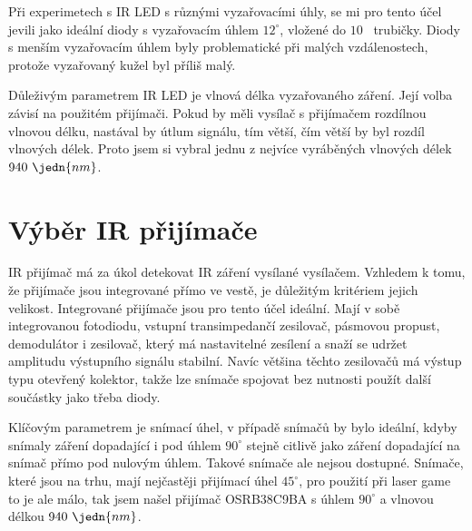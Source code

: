 Při experimetech s IR LED s různými vyzařovacími úhly, se mi pro tento účel jevili jako ideální diody s vyzařovacím úhlem $12^\circ$, vložené do $10$~ trubičky. Diody s menším vyzařovacím úhlem byly problematické při malých vzdálenostech, protože vyzařovaný kužel byl příliš malý.

Důleživým parametrem IR LED je vlnová délka vyzařovaného záření. Její volba závisí na použitém přijímači. Pokud by měli vysílač s přijímačem rozdílnou vlnovou délku, nastával by útlum signálu, tím větší, čím větší by byl rozdíl vlnových délek. Proto jsem si vybral jednu z nejvíce vyráběných vlnových délek $940~\jedn{nm}$.

\section{Výběr IR přijímače}
IR přijímač má za úkol detekovat IR záření vysílané vysílačem. Vzhledem k tomu, že přijímače jsou integrované přímo ve vestě, je důležitým kritériem jejich velikost. Integrované přijímače jsou pro tento účel ideální. Mají v sobě integrovanou fotodiodu, vstupní transimpedančí zesilovač, pásmovou propust, demodulátor i zesilovač, který má nastavitelné zesílení a snaží se udržet amplitudu výstupního signálu stabilní. Navíc většina těchto zesilovačů má výstup typu otevřený kolektor, takže lze snímače spojovat bez nutnosti použít další součástky jako třeba diody.

Klíčovým parametrem je snímací úhel, v případě snímačů by bylo ideální, kdyby snímaly záření dopadající i pod úhlem $90^\circ$ stejně citlivě jako záření dopadající na snímač přímo pod nulovým úhlem. Takové snímače ale nejsou dostupné. Snímače, které jsou na trhu, mají nejčastěji přijímací úhel $45^\circ$, pro použití při laser game to je ale málo, tak jsem našel přijímač OSRB38C9BA s úhlem $90^\circ$ a vlnovou délkou $940~\jedn{nm}$.

